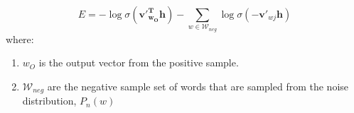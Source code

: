 \begin{enumerate}
	\begin{equation}
	E = -\log \sigma(\mathbf{v'^T_{w_O}}\mathbf{h}) - \sum_{w \in \mathcal{W}_{neg}}\log\sigma(-\mathbf{v'}_{wj}\mathbf{h})
	\end{equation}
	where: 
	\begin{enumerate}
		\item $w_O$ is the output vector from the positive sample.
		\item $\mathcal{W}_{neg}$ are the negative sample set of words that are sampled from the noise distribution, $P_{n}(w)$ 
	\end{enumerate}
\end{enumerate}